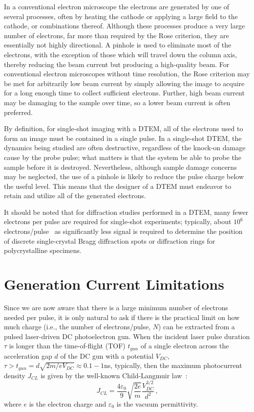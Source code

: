 In a conventional electron microscope the electrons are generated by one of several processes, often by heating the cathode or applying a large field to the cathode, or combinations thereof.
Although these processes produce a very large number of electrons, far more than required by the Rose criterion, they are essentially not highly directional.
A pinhole is used to eliminate most of the electrons, with the exception of those which will travel down the column axis, thereby reducing the beam current but producing a high-quality beam.
For conventional electron microscopes without time resolution, the Rose criterion may be met for arbitrarily low beam current by simply allowing the image to acquire for a long enough time to collect sufficient electrons.
Further, high beam current may be damaging to the sample over time, so a lower beam current is often preferred.

By definition, for single-shot imaging with a DTEM, all of the electrons used to form an image must be contained in a single pulse.
In a single-shot DTEM, the dynamics being studied are often destructive, regardless of the knock-on damage cause by the probe pulse; what matters is that the system be able to probe the sample before it is destroyed.
Nevertheless, although sample damage concerns may be neglected, the use of a pinhole is likely to reduce the pulse charge below the useful level.
This means that the designer of a DTEM must endeavor to retain and utilize all of the generated electrons.

It should be noted that for diffraction studies performed in a DTEM, many fewer electrons per pulse are required for single-shot experiments; typically, about $10^6$ electrons/pulse~\cite{armstrong_practical_2007} as significantly less signal is required to determine the position of discrete single-crystal Bragg diffraction spots or diffraction rings for polycrystalline specimens.

\section{Generation Current Limitations} \label{sec:childs_law}

Since we are now aware that there is a large minimum number of electrons needed per pulse, it is only natural to ask if there is the practical limit on how much charge (i.e., the number of electrons/pulse, $N$) can be extracted from a pulsed laser-driven DC photoelectron gun.
When the incident laser pulse duration $\tau$ is longer than the time-of-flight (TOF) $t_{gun}$ of a single electron across the acceleration gap $d$ of the DC gun with a potential $V_{DC}$, $\tau > t_{gun} = d \sqrt{2m/eV_{DC}} \approx 0.1-1$ns, typically, then the maximum photocurrent density $J_{CL}$ is given by the well-known Child-Langmuir law~\cite{child_discharge_1911,langmuir_effect_1923}:
\begin{equation}
  J_{CL} = \frac{4 \varepsilon_0}{9} \sqrt{\frac{2e}{m}} \frac{V_{DC}^{3/2}}{d^2} \,\text{,}
\end{equation}
where $e$ is the electron charge and $\varepsilon_0$ is the vacuum permittivity.

